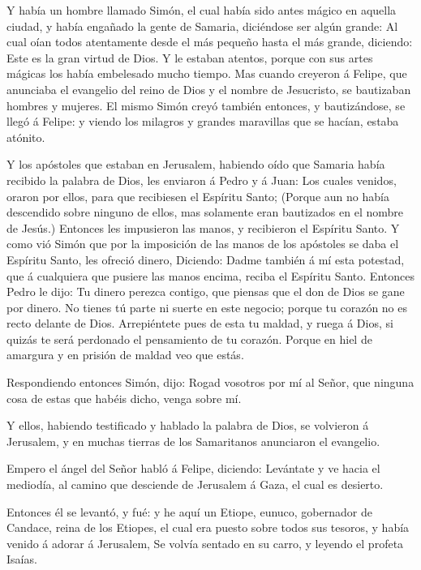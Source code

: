 Y había un hombre llamado Simón, el cual había sido antes
mágico en aquella ciudad, y había engañado la gente de Samaria,
diciéndose ser algún grande:  Al cual oían todos
atentamente desde el más pequeño hasta el más grande, diciendo: Este es
la gran virtud de Dios.  Y le estaban atentos, porque con
sus artes mágicas los había embelesado mucho tiempo.  Mas
cuando creyeron á Felipe, que anunciaba el evangelio del reino de Dios y
el nombre de Jesucristo, se bautizaban hombres y mujeres. 
El mismo Simón creyó también entonces, y bautizándose, se llegó á
Felipe: y viendo los milagros y grandes maravillas que se hacían, estaba
atónito.

 Y los apóstoles que estaban en Jerusalem, habiendo oído
que Samaria había recibido la palabra de Dios, les enviaron á Pedro y á
Juan:  Los cuales venidos, oraron por ellos, para que
recibiesen el Espíritu Santo;  (Porque aun no había
descendido sobre ninguno de ellos, mas solamente eran bautizados en el
nombre de Jesús.)  Entonces les impusieron las manos, y
recibieron el Espíritu Santo.  Y como vió Simón que por la
imposición de las manos de los apóstoles se daba el Espíritu Santo, les
ofreció dinero,  Diciendo: Dadme también á mí esta
potestad, que á cualquiera que pusiere las manos encima, reciba el
Espíritu Santo.  Entonces Pedro le dijo: Tu dinero perezca
contigo, que piensas que el don de Dios se gane por dinero.
 No tienes tú parte ni suerte en este negocio; porque tu
corazón no es recto delante de Dios.  Arrepiéntete pues de
esta tu maldad, y ruega á Dios, si quizás te será perdonado el
pensamiento de tu corazón.  Porque en hiel de amargura y en
prisión de maldad veo que estás.

 Respondiendo entonces Simón, dijo: Rogad vosotros por mí
al Señor, que ninguna cosa de estas que habéis dicho, venga sobre mí.

 Y ellos, habiendo testificado y hablado la palabra de
Dios, se volvieron á Jerusalem, y en muchas tierras de los Samaritanos
anunciaron el evangelio.

 Empero el ángel del Señor habló á Felipe, diciendo:
Levántate y ve hacia el mediodía, al camino que desciende de Jerusalem á
Gaza, el cual es desierto.

 Entonces él se levantó, y fué: y he aquí un Etiope,
eunuco, gobernador de Candace, reina de los Etiopes, el cual era puesto
sobre todos sus tesoros, y había venido á adorar á Jerusalem,
 Se volvía sentado en su carro, y leyendo el profeta
Isaías.

